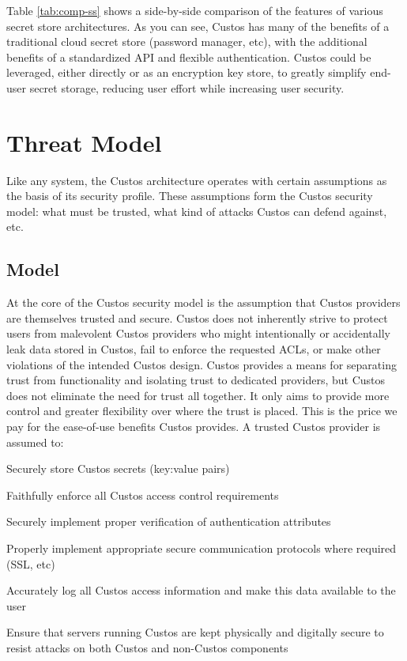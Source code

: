 Table \ref{tab:comp-ss} shows a side-by-side comparison of the
features of various secret store architectures. As you can see, Custos
has many of the benefits of a traditional cloud secret store (password
manager, etc), with the additional benefits of a standardized API and
flexible authentication. Custos could be leveraged, either directly or
as an encryption key store, to greatly simplify end-user secret
storage, reducing user effort while increasing user security.

\section{Threat Model}

Like any system, the Custos architecture operates with certain
assumptions as the basis of its security profile. These assumptions
form the Custos security model: what must be trusted, what kind of
attacks Custos can defend against, etc.

\subsection{Model}

At the core of the Custos security model is the assumption that Custos
providers are themselves trusted and secure. Custos does not
inherently strive to protect users from malevolent Custos providers
who might intentionally or accidentally leak data stored in Custos,
fail to enforce the requested ACLs, or make other violations of the
intended Custos design. Custos provides a means for separating trust
from functionality and isolating trust to dedicated providers, but
Custos does not eliminate the need for trust all together. It only
aims to provide more control and greater flexibility over where the
trust is placed. This is the price we pay for the ease-of-use benefits
Custos provides. A trusted Custos provider is assumed to:

\begin{packed_item}
\item Securely store Custos secrets (key:value pairs)
\item Faithfully enforce all Custos access control requirements
\item Securely implement proper verification of authentication attributes
\item Properly implement appropriate secure communication protocols where
  required (SSL, etc)
\item Accurately log all Custos access information and make this data
  available to the user
\item Ensure that servers running Custos are kept physically and
  digitally secure to resist attacks on both Custos and non-Custos
  components~\cite{Cebula2010}
\end{packed_item}


